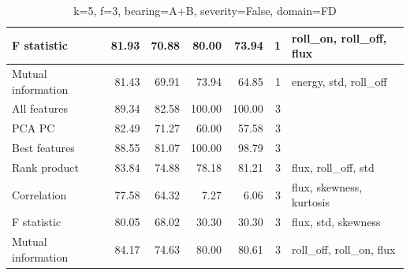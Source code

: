 \begin{table}[]
\begin{tabular}{|l|rr|rr|r|l|}
F statistic                           & \multicolumn{1}{r|}{81.93}          & 70.88                              & \multicolumn{1}{r|}{80.00}          & 73.94                              & 1                                                   & roll\_on, roll\_off, flux               \\ \hline
Mutual information                    & \multicolumn{1}{r|}{81.43}          & 69.91                              & \multicolumn{1}{r|}{73.94}          & 64.85                              & 1                                                   & energy, std, roll\_off                  \\ \hline
All features                          & \multicolumn{1}{r|}{89.34}          & 82.58                              & \multicolumn{1}{r|}{100.00}         & 100.00                             & 3                                                   &                                         \\ \hline
PCA PC                                & \multicolumn{1}{r|}{82.49}          & 71.27                              & \multicolumn{1}{r|}{60.00}          & 57.58                              & 3                                                   &                                         \\ \hline
Best features                         & \multicolumn{1}{r|}{88.55}          & 81.07                              & \multicolumn{1}{r|}{100.00}         & 98.79                              & 3                                                   &                                         \\ \hline
Rank product                          & \multicolumn{1}{r|}{83.84}          & 74.88                              & \multicolumn{1}{r|}{78.18}          & 81.21                              & 3                                                   & flux, roll\_off, std                    \\ \hline
Correlation                           & \multicolumn{1}{r|}{77.58}          & 64.32                              & \multicolumn{1}{r|}{7.27}           & 6.06                               & 3                                                   & flux, skewness, kurtosis                \\ \hline
F statistic                           & \multicolumn{1}{r|}{80.05}          & 68.02                              & \multicolumn{1}{r|}{30.30}          & 30.30                              & 3                                                   & flux, std, skewness                     \\ \hline
Mutual information                    & \multicolumn{1}{r|}{84.17}          & 74.63                              & \multicolumn{1}{r|}{80.00}          & 80.61                              & 3                                                   & roll\_off, roll\_on, flux               \\ \hline
\end{tabular}
\caption{k=5, f=3, bearing=A+B, severity=False, domain=FD}
\end{table}


